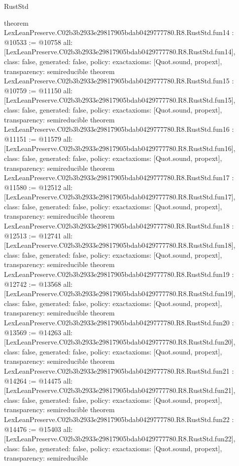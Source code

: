 \begin{lexlean}{RustStd}
\begin{coremodule}
{}
theorem LexLeanPreserve.C02b3b2933e29817905bdab0429777780.R8.RustStd.fun14 : @10533 := @10758 {
  all: [LexLeanPreserve.C02b3b2933e29817905bdab0429777780.R8.RustStd.fun14],
  class: false,
  generated: false,
  policy: exact{axioms: [Quot.sound, propext]},
  transparency: semireducible
}
theorem LexLeanPreserve.C02b3b2933e29817905bdab0429777780.R8.RustStd.fun15 : @10759 := @11150 {
  all: [LexLeanPreserve.C02b3b2933e29817905bdab0429777780.R8.RustStd.fun15],
  class: false,
  generated: false,
  policy: exact{axioms: [Quot.sound, propext]},
  transparency: semireducible
}
theorem LexLeanPreserve.C02b3b2933e29817905bdab0429777780.R8.RustStd.fun16 : @11151 := @11579 {
  all: [LexLeanPreserve.C02b3b2933e29817905bdab0429777780.R8.RustStd.fun16],
  class: false,
  generated: false,
  policy: exact{axioms: [Quot.sound, propext]},
  transparency: semireducible
}
theorem LexLeanPreserve.C02b3b2933e29817905bdab0429777780.R8.RustStd.fun17 : @11580 := @12512 {
  all: [LexLeanPreserve.C02b3b2933e29817905bdab0429777780.R8.RustStd.fun17],
  class: false,
  generated: false,
  policy: exact{axioms: [Quot.sound, propext]},
  transparency: semireducible
}
theorem LexLeanPreserve.C02b3b2933e29817905bdab0429777780.R8.RustStd.fun18 : @12513 := @12741 {
  all: [LexLeanPreserve.C02b3b2933e29817905bdab0429777780.R8.RustStd.fun18],
  class: false,
  generated: false,
  policy: exact{axioms: [Quot.sound, propext]},
  transparency: semireducible
}
theorem LexLeanPreserve.C02b3b2933e29817905bdab0429777780.R8.RustStd.fun19 : @12742 := @13568 {
  all: [LexLeanPreserve.C02b3b2933e29817905bdab0429777780.R8.RustStd.fun19],
  class: false,
  generated: false,
  policy: exact{axioms: [Quot.sound, propext]},
  transparency: semireducible
}
theorem LexLeanPreserve.C02b3b2933e29817905bdab0429777780.R8.RustStd.fun20 : @13569 := @14263 {
  all: [LexLeanPreserve.C02b3b2933e29817905bdab0429777780.R8.RustStd.fun20],
  class: false,
  generated: false,
  policy: exact{axioms: [Quot.sound, propext]},
  transparency: semireducible
}
theorem LexLeanPreserve.C02b3b2933e29817905bdab0429777780.R8.RustStd.fun21 : @14264 := @14475 {
  all: [LexLeanPreserve.C02b3b2933e29817905bdab0429777780.R8.RustStd.fun21],
  class: false,
  generated: false,
  policy: exact{axioms: [Quot.sound, propext]},
  transparency: semireducible
}
theorem LexLeanPreserve.C02b3b2933e29817905bdab0429777780.R8.RustStd.fun22 : @14476 := @15403 {
  all: [LexLeanPreserve.C02b3b2933e29817905bdab0429777780.R8.RustStd.fun22],
  class: false,
  generated: false,
  policy: exact{axioms: [Quot.sound, propext]},
  transparency: semireducible
}
\end{coremodule}
\end{lexlean}
